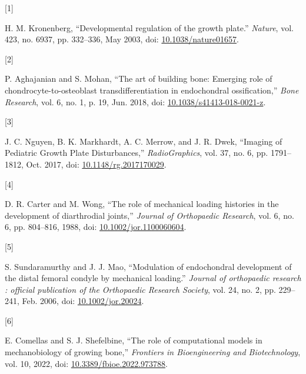 \documentclass[
  letterpaper,
  DIV=11,
  numbers=noendperiod]{scrartcl}
\newlength{\cslhangindent}
\newlength{\csllabelwidth}
\newenvironment{CSLReferences}[2] %
 {\begin{list}{}{%
  \setlength{\itemindent}{0pt}
  \setlength{\leftmargin}{0pt}
  \setlength{\parsep}{0pt}
  \ifodd #1
   \setlength{\leftmargin}{\cslhangindent}
   \setlength{\itemindent}{-1\cslhangindent}
  \fi
  \setlength{\itemsep}{#2\baselineskip}}}
 {\end{list}}
\newcommand{\CSLLeftMargin}[1]{\parbox[t]{\csllabelwidth}{\strut#1\strut}}
\newcommand{\CSLRightInline}[1]{\parbox[t]{\linewidth - \csllabelwidth}{\strut#1\strut}}
\begin{document}
\label{refs}
\begin{CSLReferences}{0}{0}
\CSLLeftMargin{{[}1{]} }%
\CSLRightInline{H. M. Kronenberg, {``Developmental regulation of the
growth plate.''} \emph{Nature}, vol. 423, no. 6937, pp. 332--336, May
2003, doi:
\href{https://doi.org/10.1038/nature01657}{10.1038/nature01657}.}

\CSLLeftMargin{{[}2{]} }%
\CSLRightInline{P. Aghajanian and S. Mohan, {``The art of building bone:
Emerging role of chondrocyte-to-osteoblast transdifferentiation in
endochondral ossification,''} \emph{Bone Research}, vol. 6, no. 1, p.
19, Jun. 2018, doi:
\href{https://doi.org/10.1038/s41413-018-0021-z}{10.1038/s41413-018-0021-z}.}

\CSLLeftMargin{{[}3{]} }%
\CSLRightInline{J. C. Nguyen, B. K. Markhardt, A. C. Merrow, and J. R.
Dwek, {``Imaging of {Pediatric Growth Plate Disturbances},''}
\emph{RadioGraphics}, vol. 37, no. 6, pp. 1791--1812, Oct. 2017, doi:
\href{https://doi.org/10.1148/rg.2017170029}{10.1148/rg.2017170029}.}

\CSLLeftMargin{{[}4{]} }%
\CSLRightInline{D. R. Carter and M. Wong, {``The role of mechanical
loading histories in the development of diarthrodial joints,''}
\emph{Journal of Orthopaedic Research}, vol. 6, no. 6, pp. 804--816,
1988, doi:
\href{https://doi.org/10.1002/jor.1100060604}{10.1002/jor.1100060604}.}

\CSLLeftMargin{{[}5{]} }%
\CSLRightInline{S. Sundaramurthy and J. J. Mao, {``Modulation of
endochondral development of the distal femoral condyle by mechanical
loading.''} \emph{Journal of orthopaedic research : official publication
of the Orthopaedic Research Society}, vol. 24, no. 2, pp. 229--241, Feb.
2006, doi: \href{https://doi.org/10.1002/jor.20024}{10.1002/jor.20024}.}

\CSLLeftMargin{{[}6{]} }%
\CSLRightInline{E. Comellas and S. J. Shefelbine, {``The role of
computational models in mechanobiology of growing bone,''}
\emph{Frontiers in Bioengineering and Biotechnology}, vol. 10, 2022,
doi:
\href{https://doi.org/10.3389/fbioe.2022.973788}{10.3389/fbioe.2022.973788}.}


\end{CSLReferences}
\end{document}
